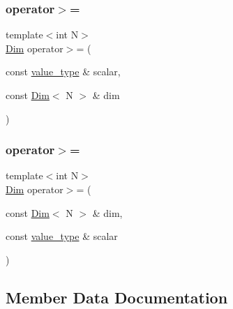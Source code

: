 \subsubsection{\texorpdfstring{operator$>$=}{operator>=}\hspace{0.1cm}{\footnotesize\ttfamily [1/2]}}
{\footnotesize\ttfamily template$<$int N$>$ \\
\hyperlink{structbc_1_1Dim}{Dim} operator$>$= (\begin{DoxyParamCaption}\item[{const \hyperlink{structbc_1_1Dim_af59ff554825273cf6bd9619b2c78c196}{value\+\_\+type} \&}]{scalar,  }\item[{const \hyperlink{structbc_1_1Dim}{Dim}$<$ N $>$ \&}]{dim }\end{DoxyParamCaption})\hspace{0.3cm}{\ttfamily [friend]}}

\mbox{\label{structbc_1_1Dim_ad522ba0026531e57284e6b93e7b494d5}} 
\subsubsection{\texorpdfstring{operator$>$=}{operator>=}\hspace{0.1cm}{\footnotesize\ttfamily [2/2]}}
{\footnotesize\ttfamily template$<$int N$>$ \\
\hyperlink{structbc_1_1Dim}{Dim} operator$>$= (\begin{DoxyParamCaption}\item[{const \hyperlink{structbc_1_1Dim}{Dim}$<$ N $>$ \&}]{dim,  }\item[{const \hyperlink{structbc_1_1Dim_af59ff554825273cf6bd9619b2c78c196}{value\+\_\+type} \&}]{scalar }\end{DoxyParamCaption})\hspace{0.3cm}{\ttfamily [friend]}}



\subsection{Member Data Documentation}
\mbox{\label{structbc_1_1Dim_aae2f270b732a93eb573ecba26afc26e4}} 
